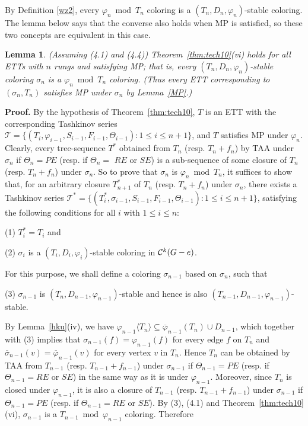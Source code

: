 \documentclass[11pt]{article}
\newtheorem{lemma}[theorem]{Lemma}
\newcommand{\TT}{\mathcal {T}}
\newcommand{\phibar}{\overline{\varphi}}
\newcommand{\phiv}{\varphi}
\begin{document}
\vskip 3mm

By Definition \ref{wz2}, every $\phiv_n\bmod T_n$ coloring is a $(T_n,D_n,\varphi_n)$-stable coloring. The lemma below says that 
the converse also holds when MP is satisfied, so these two concepts are equivalent in this case. 

\begin{lemma}\label{td}
(Assuming (4.1) and (4.4)) Theorem~\ref{thm:tech10}(vi) holds for all ETTs with $n$ rungs and  
satisfying MP; that is, every $(T_n,D_n,\varphi_n)$-stable coloring $\sigma_n$ is a $\phiv_n\bmod T_n$ coloring.
(Thus every ETT  corresponding to $(\sigma_n, T_n)$ satisfies MP under $\sigma_n$ by Lemma~\ref{MP}.)
\end{lemma}

{\bf Proof.}  By the hypothesis of Theorem~\ref{thm:tech10}, $T$ is an ETT with the corresponding Tashkinov series 
$\TT=\{(T_i, \phiv_{i-1}, S_{i-1}, F_{i-1}, \Theta_{i-1}): 1\le i \le n+1\}$, and $T$ satisfies MP under $\varphi_n$. 
Clearly, every tree-sequence $T^*$ obtained from $T_n$ (resp. $T_n+f_n$) by TAA under $\sigma_n$ if $\Theta_n=PE$ 
(resp. if $\Theta_n=$ $RE$ or $SE$) is a sub-sequence of some closure of $T_n$ (resp. $T_n+f_n$) under $\sigma_n$. 
So to prove that $\sigma_n$ is $\phiv_n\bmod T_n$, it suffices to show that, for an arbitrary closure $T^*_{n+1}$ of $T_n$ 
(resp. $T_n+f_n$) under $\sigma_n$, there exists a Tashkinov series $\TT^*=\{(T_i^*, \sigma_{i-1}, 
S_{i-1}, F_{i-1}, \Theta_{i-1}): 1\le i \le n+1\}$, satisfying the following conditions for all $i$ with $1\le i \le n$:

\vskip 1mm

(1) $T_i^*=T_i$ and

(2) $\sigma_i$ is a $(T_i, D_i, \varphi_i)$-stable coloring in ${\cal C}^k(G-e)$.


For this purpose,  we shall define a coloring $\sigma_{n-1}$ based on $\sigma_n$, such that

(3) $\sigma_{n-1}$ is $(T_{n},D_{n-1},\varphi_{n-1})$-stable and hence is also $(T_{n-1},D_{n-1},\varphi_{n-1})$-stable.

By Lemma~\ref{hku}(iv), we have $\varphi_{n-1} \langle T_n \rangle \subseteq \phibar_{n-1}(T_n)\cup D_{n-1}$, which together with (3) implies that  
$\sigma_{n-1}(f)=\varphi_{n-1}(f)$ for every edge $f$ on $T_n$ and $\overline{\sigma}_{n-1}(v)=\phibar_{n-1}(v)$ for every 
vertex $v$ in $T_n$. Hence $T_n$ can be obtained by TAA from $T_{n-1}$ (resp. $T_{n-1}+f_{n-1}$) under $\sigma_{n-1}$ if $\Theta_{n-1}=PE$ 
(resp. if $\Theta_{n-1}=RE$ or $SE$) in the same way as it is under $\varphi_{n-1}$. Moreover, since $T_n$ is closed under $\varphi_{n-1}$, 
it is also a closure of $T_{n-1}$ (resp. $T_{n-1}+f_{n-1}$) under $\sigma_{n-1}$ if $\Theta_{n-1}=PE$ (resp. if $\Theta_{n-1}=RE$ or $SE$). 
By (3), (4.1) and Theorem~\ref{thm:tech10}(vi), $\sigma_{n-1}$ is a $T_{n-1}\bmod\varphi_{n-1}$ coloring. Therefore  
\end{document}
